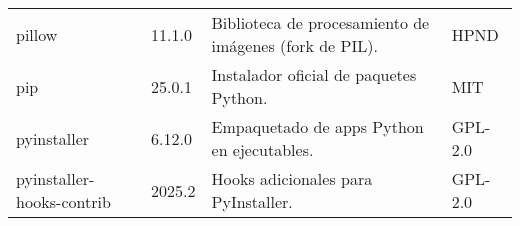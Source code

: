 \begin{longtable}[]{@{}llll@{}}
    \begin{minipage}[t]{0.18\columnwidth}\raggedright\strut pillow \strut \end{minipage} & \begin{minipage}[t]{0.10\columnwidth}\raggedright\strut 11.1.0 \strut \end{minipage} & \begin{minipage}[t]{0.49\columnwidth}\raggedright\strut Biblioteca de procesamiento de imágenes (fork de PIL). \strut \end{minipage} & \begin{minipage}[t]{0.11\columnwidth}\raggedright\strut HPND \strut \end{minipage} \tabularnewline

    \begin{minipage}[t]{0.18\columnwidth}\raggedright\strut pip \strut \end{minipage} & \begin{minipage}[t]{0.10\columnwidth}\raggedright\strut 25.0.1 \strut \end{minipage} & \begin{minipage}[t]{0.49\columnwidth}\raggedright\strut Instalador oficial de paquetes Python. \strut \end{minipage} & \begin{minipage}[t]{0.11\columnwidth}\raggedright\strut MIT \strut \end{minipage} \tabularnewline

    \begin{minipage}[t]{0.18\columnwidth}\raggedright\strut pyinstaller \strut \end{minipage} & \begin{minipage}[t]{0.10\columnwidth}\raggedright\strut 6.12.0 \strut \end{minipage} & \begin{minipage}[t]{0.49\columnwidth}\raggedright\strut Empaquetado de apps Python en ejecutables. \strut \end{minipage} & \begin{minipage}[t]{0.11\columnwidth}\raggedright\strut GPL-2.0 \strut \end{minipage} \tabularnewline

    \begin{minipage}[t]{0.18\columnwidth}\raggedright\strut pyinstaller-hooks-contrib \strut \end{minipage} & \begin{minipage}[t]{0.10\columnwidth}\raggedright\strut 2025.2 \strut \end{minipage} & \begin{minipage}[t]{0.49\columnwidth}\raggedright\strut Hooks adicionales para PyInstaller. \strut \end{minipage} & \begin{minipage}[t]{0.11\columnwidth}\raggedright\strut GPL-2.0 \strut \end{minipage} \tabularnewline


\end{longtable}

